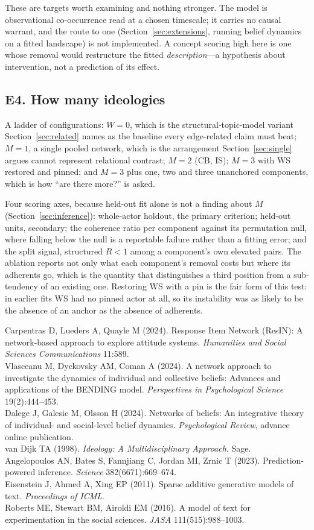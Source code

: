 \documentclass[11pt]{article}
\newcommand{\1}{\mathbb{1}}
\begin{document}
These are targets worth examining and nothing stronger. The model is observational
co-occurrence read at a chosen timescale; it carries no causal warrant, and the route to one
(Section~\ref{sec:extensions}, running belief dynamics on a fitted landscape) is not
implemented. A concept scoring high here is one whose removal would restructure the fitted
\emph{description}---a hypothesis about intervention, not a prediction of its effect.

\subsection*{E4. How many ideologies}
A ladder of configurations: $W=0$, which is the structural-topic-model variant
Section~\ref{sec:related} names as the baseline every edge-related claim must beat; $M=1$, a
single pooled network, which is the arrangement Section~\ref{sec:single} argues cannot
represent relational contrast; $M=2$ (CB, IS); $M=3$ with WS restored and pinned; and $M=3$
plus one, two and three unanchored components, which is how ``are there more?'' is asked.

Four scoring axes, because held-out fit alone is not a finding about $M$
(Section~\ref{sec:inference}): whole-actor holdout, the primary criterion; held-out units,
secondary; the coherence ratio per component against its permutation null, where falling
below the null is a reportable failure rather than a fitting error; and the split signal,
structured $R<1$ among a component's own elevated pairs. The ablation reports not only what
each component's removal costs but where its adherents go, which is the quantity that
distinguishes a third position from a sub-tendency of an existing one. Restoring WS with a
pin is the fair form of this test: in earlier fits WS had no pinned actor at all, so its
instability was as likely to be the absence of an anchor as the absence of adherents.

\vfill
\noindent\footnotesize
Carpentras D, Lueders A, Quayle M (2024). Response Item Network (ResIN): A network-based approach to explore attitude systems. \emph{Humanities and Social Sciences Communications} 11:589.\\
Vlasceanu M, Dyckovsky AM, Coman A (2024). A network approach to investigate the dynamics of individual and collective beliefs: Advances and applications of the BENDING model. \emph{Perspectives in Psychological Science} 19(2):444--453.\\
Dalege J, Galesic M, Olsson H (2024). Networks of beliefs: An integrative theory of individual- and social-level belief dynamics. \emph{Psychological Review}, advance online publication.\\
van Dijk TA (1998). \emph{Ideology: A Multidisciplinary Approach}. Sage.\\
Angelopoulos AN, Bates S, Fannjiang C, Jordan MI, Zrnic T (2023). Prediction-powered inference. \emph{Science} 382(6671):669--674.\\
Eisenstein J, Ahmed A, Xing EP (2011). Sparse additive generative models of text. \emph{Proceedings of ICML}.\\
Roberts ME, Stewart BM, Airoldi EM (2016). A model of text for experimentation in the social sciences. \emph{JASA} 111(515):988--1003.
\normalsize
\end{document}
